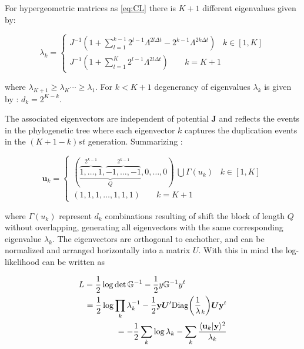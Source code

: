\documentclass[reprint,amsmath,amssymb,superscriptaddress,showpacs,pre]{revtex4-1}
\let\originalleft\left
\let\originalright\right
\renewcommand{\left}{\mathopen{}\mathclose\bgroup\originalleft}
\renewcommand{\right}{\aftergroup\egroup\originalright}
\begin{document}
For hypergeometric matrices as \ref{eq:CL} there is $K+1$ different eigenvalues  given by: 

\begin{equation}
\label{eq:lambda_hyper}
\lambda_k =
\begin{cases}
J^{-1}(1+\sum_{l=1}^{k-1} 2^{l-1}\Lambda^{2l\Delta t}-2^{k-1}\Lambda^{2k\Delta t} )\;\;\; k\in[1,K] \\
J^{-1}(1+\sum_{l=1}^{K} 2^{l-1}\Lambda^{2l\Delta t}) \;\;\;\;\;\;\;k=K+1
\end{cases}
\end{equation}

where $\lambda_{K+1}\ge\lambda_{K}\cdots\ge\lambda_{1}$. For $k<K+1$ degenerancy of eigenvalues $\lambda_k$ is given by : $d_k=2^{K-k}$.  

The associated eigenvectors are independent of potential $\bm J$ and reflects the events in the phylogenetic tree  where each eigenvector  $k$ captures the duplication events in the $(K+1 -k) 	st$ generation. Summarizing :

\begin{equation} 
\nonumber
	\bm u_k =
	\begin{cases}
	{(\underbrace{\overbrace{1,\ldots,1}^{2^{k-1}},\overbrace{-1,\ldots,-1}^{2^{k-1}}}_Q,0,\ldots,0)\ \bigcup \Gamma(u_k) } \;\;\; k\in[1,K] \\
	(1,1,1,\ldots,1,1,1)\;\;\;\;\;\;\;k=K+1
	\label{eq:eigenvec_simpler_case}
\end{cases}	
\end{equation}

where $\Gamma(u_k)$ represent $d_k$ combinations resulting of shift the block of length $Q$ without overlapping, generating all eigenvectors with the same corresponding eigenvalue $\lambda_k$.  The eigenvectors are orthogonal to eachother, and can be  normalized and arranged horizontally into a matrix $U$. With this in mind  the log-likelihood can be written as             
           
\begin{eqnarray}
\nonumber
\lefteqn{L=\frac 1 2 \log\det \mathbb{G} ^{-1}-\frac 1 2 y \mathbb{G} ^{-1}y^t}\\
&&=\frac 1 2 \log\prod_{k}\lambda_k^{-1}  -\frac 1 2 \mathbf{y}  \bm U' \mbox{Diag}\left({\frac 1 \lambda_k}\right) \bm U \mathbf{y}^t \\\nonumber
&&=-\frac 1 2\sum_{k}\log\lambda_k-\sum_k \frac{\langle \mathbf{u}_k | \mathbf{y}\rangle^2}{\lambda_k} 
\end{eqnarray}
\end{document}
